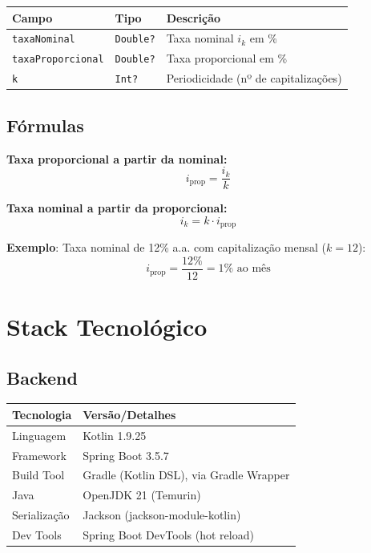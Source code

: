 \documentclass[12pt,a4paper]{article}
\begin{document}
\begin{center}
\begin{tabular}{llp{6.5cm}}
  \toprule
  \textbf{Campo} & \textbf{Tipo} & \textbf{Descrição} \\
  \midrule
  \texttt{taxaNominal}       & \texttt{Double?} & Taxa nominal $i_k$ em \% \\
  \texttt{taxaProporcional}  & \texttt{Double?} & Taxa proporcional em \% \\
  \texttt{k}                 & \texttt{Int?}    & Periodicidade (nº de capitalizações) \\
  \bottomrule
\end{tabular}
\end{center}

\subsection{Fórmulas}

\begin{tcolorbox}[colback=white,colframe=teal600,title=Fórmulas --- Taxas Abaixo]

\textbf{Taxa proporcional a partir da nominal:}
\begin{equation}
  i_{\text{prop}} = \frac{i_k}{k}
\end{equation}

\textbf{Taxa nominal a partir da proporcional:}
\begin{equation}
  i_k = k \cdot i_{\text{prop}}
\end{equation}

\textbf{Exemplo}: Taxa nominal de 12\% a.a. com capitalização mensal ($k = 12$):
\[
  i_{\text{prop}} = \frac{12\%}{12} = 1\% \text{ ao mês}
\]

\end{tcolorbox}

\section{Stack Tecnológico}

\subsection{Backend}

\begin{center}
\begin{tabular}{ll}
  \toprule
  \textbf{Tecnologia} & \textbf{Versão/Detalhes} \\
  \midrule
  Linguagem      & Kotlin 1.9.25 \\
  Framework      & Spring Boot 3.5.7 \\
  Build Tool     & Gradle (Kotlin DSL), via Gradle Wrapper \\
  Java           & OpenJDK 21 (Temurin) \\
  Serialização   & Jackson (jackson-module-kotlin) \\
  Dev Tools      & Spring Boot DevTools (hot reload) \\
  \bottomrule
\end{tabular}
\end{center}
\end{document}

